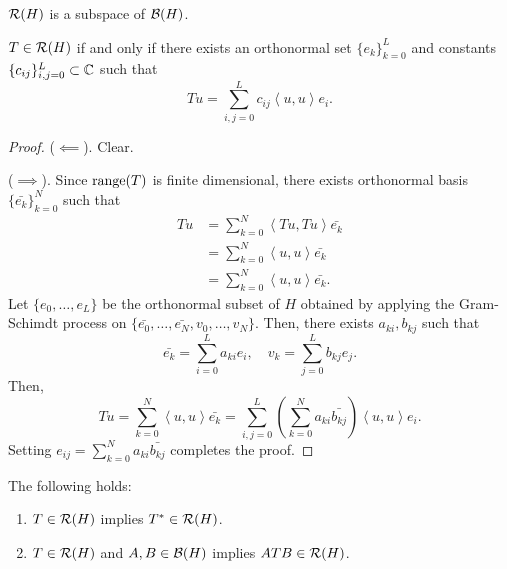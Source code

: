 \documentclass[a4paper]{article}
\renewcommand{\braket}[2]{\left\langle #1, #1 \right\rangle}
\begin{document}
\begin{thm}
$\mathcal{R} (H)$ is a subspace of $\mathcal{B} (H)$.
\end{thm}

\begin{thm}
$T \in \mathcal{R} (H)$ if and only if there exists an 
orthonormal set $\{e_k\}_{k=0}^L$ and constants
$\{c_{ij}\}_{i,j=0}^L \subset \mathbb{C}$ such that 
\[
T u = \sum_{i, j = 0}^L c_{ij} \braket{u}{e_j} e_i.
\]
\end{thm}

\begin{proof}
($\impliedby$). Clear. 

($\implies$). Since $\operatorname{range}(T)$ is finite dimensional, there 
exists orthonormal basis $\{\bar{e_k}\}_{k=0}^N$ such that 
\[
\begin{aligned}
  T u 
  &= \sum_{k=0}^N \braket{T u}{\bar{e_k}} \bar{e_k} \\
  &= \sum_{k=0}^N \braket{u}{T^* \bar{e_k}} \bar{e_k} \\
  &= \sum_{k=0}^N \braket{u}{v_k} \bar{e_k}.
\end{aligned}
\]
Let $\{e_0, \dots, e_L\}$ be the orthonormal subset 
of $H$ obtained by applying the Gram-Schimdt process 
on $\{\bar{e_0}, \dots, \bar{e_N}, v_0, \dots, v_N\}$. 
Then, there exists $a_{ki}, b_{kj}$ such that 
\[
\bar{e_k} = \sum_{i=0}^L a_{ki} e_i, \quad 
v_k = \sum_{j=0}^L b_{kj} e_j.
\]
Then, 
\[
T u = \sum_{k=0}^N \braket{u}{v_k} \bar{e_k}
= \sum_{i, j = 0}^L \left( \sum_{k=0}^N a_{ki} 
\bar{b_{kj}} \right) \braket{u}{e_j} e_i.
\]
Setting $e_{ij} = \sum_{k=0}^N a_{ki} \bar{b_{kj}}$
completes the proof.
\end{proof}

\begin{thm}
The following holds:
\begin{enumerate}
  \item $T \in \mathcal{R}(H)$ implies $T^* \in \mathcal{R} (H)$. 
  \item $T \in \mathcal{R}(H)$ and $A, B \in \mathcal{B}(H)$ implies 
  $A T B \in \mathcal{R}(H)$.
\end{enumerate}
\end{thm}
\end{document}
